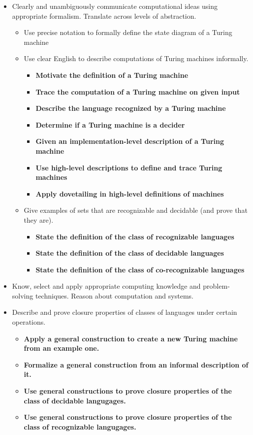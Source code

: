 \documentclass[12pt, oneside]{article}
\begin{document}
\begin{itemize}
    \item Clearly and unambiguously communicate computational ideas using appropriate formalism. Translate across levels of abstraction.
    \begin{itemize}
        \item Use precise notation to formally define the state diagram of a Turing machine
        \item Use clear English to describe computations of Turing machines informally.
        \begin{itemize}
                \item {\bf Motivate the definition of a Turing machine}
                \item {\bf Trace the computation of a Turing machine on given input}
                \item {\bf Describe the language recognized by a Turing machine}
                \item {\bf Determine if a Turing machine is a decider}
                \item {\bf Given an implementation-level description of a Turing machine}
                \item {\bf Use high-level descriptions to define and trace Turing machines}
                \item {\bf Apply dovetailing in high-level definitions of machines}
         \end{itemize}
       \item Give examples of sets that are recognizable and decidable (and prove that they are).
       \begin{itemize}
          \item {\bf State the definition of the class of recognizable languages}
          \item {\bf State the definition of the class of decidable languages}
          \item {\bf State the definition of the class of co-recognizable languages}
       \end{itemize}
    \end{itemize}
    \item Know, select and apply appropriate computing knowledge and problem-solving techniques. 
    Reason about computation and systems.
    \item Describe and prove closure properties of classes of languages under certain operations.
    \begin{itemize}
        \item {\bf Apply a general construction to create a new Turing machine from an example one.}
        \item {\bf Formalize a general construction from an informal description of it.}
        \item {\bf Use general constructions to prove closure properties of the class of decidable langugages.}
        \item {\bf Use general constructions to prove closure properties of the class of recognizable langugages.}
    \end{itemize}
\end{itemize}
\end{document}
